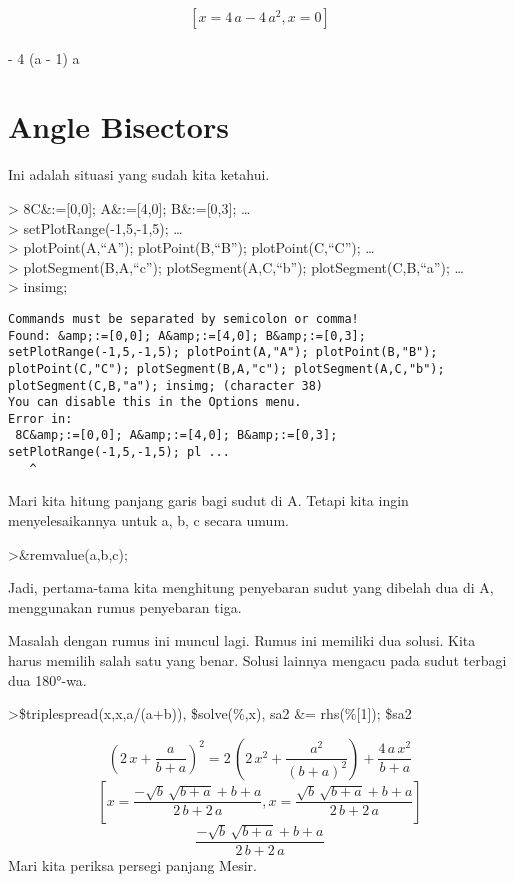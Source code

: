 \documentclass[
]{book}
\begin{document}
\[\left[ x=4\,a-4\,a^2 , x=0 \right] \]\\
- 4 (a - 1) a

\section{Angle Bisectors}\label{angle-bisectors}

Ini adalah situasi yang sudah kita ketahui.

\textgreater{} 8C\&:={[}0,0{]}; A\&:={[}4,0{]}; B\&:={[}0,3{]}; \ldots{}\\
\textgreater{} setPlotRange(-1,5,-1,5); \ldots{}\\
\textgreater{} plotPoint(A,``A''); plotPoint(B,``B''); plotPoint(C,``C''); \ldots{}\\
\textgreater{} plotSegment(B,A,``c''); plotSegment(A,C,``b''); plotSegment(C,B,``a''); \ldots{}\\
\textgreater{} insimg;

\begin{verbatim}
Commands must be separated by semicolon or comma!
Found: &amp;:=[0,0]; A&amp;:=[4,0]; B&amp;:=[0,3]; setPlotRange(-1,5,-1,5); plotPoint(A,"A"); plotPoint(B,"B"); plotPoint(C,"C"); plotSegment(B,A,"c"); plotSegment(A,C,"b"); plotSegment(C,B,"a"); insimg; (character 38)
You can disable this in the Options menu.
Error in:
 8C&amp;:=[0,0]; A&amp;:=[4,0]; B&amp;:=[0,3]; setPlotRange(-1,5,-1,5); pl ...
   ^
\end{verbatim}

Mari kita hitung panjang garis bagi sudut di A. Tetapi kita ingin menyelesaikannya untuk a, b, c secara umum.

\textgreater\&remvalue(a,b,c);

Jadi, pertama-tama kita menghitung penyebaran sudut yang dibelah dua di A, menggunakan rumus penyebaran tiga.

Masalah dengan rumus ini muncul lagi. Rumus ini memiliki dua solusi. Kita harus memilih salah satu yang benar. Solusi lainnya mengacu pada sudut terbagi dua 180°-wa.

\textgreater\$triplespread(x,x,a/(a+b)), \$solve(\%,x), sa2 \&= rhs(\%{[}1{]}); \$sa2

\[\left(2\,x+\frac{a}{b+a}\right)^2=2\,\left(2\,x^2+\frac{a^2}{\left(
 b+a\right)^2}\right)+\frac{4\,a\,x^2}{b+a}\]\[\left[ x=\frac{-\sqrt{b}\,\sqrt{b+a}+b+a}{2\,b+2\,a} , x=\frac{
 \sqrt{b}\,\sqrt{b+a}+b+a}{2\,b+2\,a} \right] \]\[\frac{-\sqrt{b}\,\sqrt{b+a}+b+a}{2\,b+2\,a}\]Mari kita periksa persegi panjang Mesir.
\end{document}
